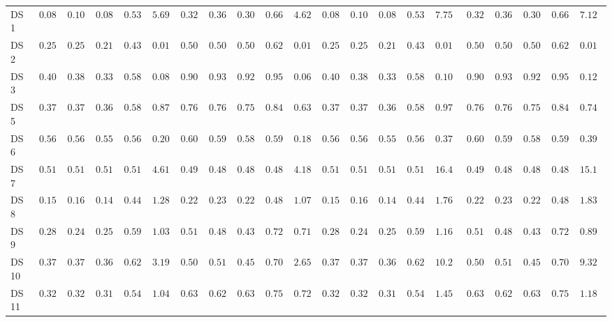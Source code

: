 {\begin{longtable}{|l|ccccc|ccccc|ccccc|ccccc|}
		DS 1 & $0.0833$ & $0.1024$ & $0.0858$ & $0.5325$ & $5.6923$ & $0.3264$ & $0.3657$ & $0.3035$ & $0.6697$ & $\boldsymbol{4.6228}$ & $0.0833$ & $0.1024$ & $0.0858$ & $0.5325$ & $7.7565$ & $0.3264$ & $0.3657$ & $0.3035$ & $0.6697$ & $7.1249$ \\
		DS 2 & $0.2500$ & $0.2500$ & $0.2167$ & $0.4375$ & $0.0159$ & $0.5000$ & $0.5000$ & $0.5000$ & $0.6250$ & $\boldsymbol{0.0113}$ & $0.2500$ & $0.2500$ & $0.2167$ & $0.4375$ & $0.0163$ & $0.5000$ & $0.5000$ & $0.5000$ & $0.6250$ & $0.0146$ \\
		DS 3 & $0.4000$ & $0.3812$ & $0.3333$ & $0.5875$ & $0.0849$ & $0.9000$ & $0.9375$ & $0.9226$ & $0.9583$ & $\boldsymbol{0.0665}$ & $0.4000$ & $0.3812$ & $0.3333$ & $0.5875$ & $0.1005$ & $0.9000$ & $0.9375$ & $0.9226$ & $0.9583$ & $0.1280$ \\
		DS 5 & $0.3768$ & $0.3772$ & $0.3614$ & $0.5848$ & $0.8787$ & $0.7681$ & $0.7657$ & $0.7571$ & $0.8438$ & $\boldsymbol{0.6383}$ & $0.3768$ & $0.3772$ & $0.3614$ & $0.5848$ & $0.9766$ & $0.7681$ & $0.7657$ & $0.7571$ & $0.8438$ & $0.7430$ \\
		DS 6 & $0.5600$ & $0.5641$ & $0.5572$ & $0.5641$ & $0.2068$ & $0.6000$ & $0.5929$ & $0.5833$ & $0.5929$ & $\boldsymbol{0.1801}$ & $0.5600$ & $0.5641$ & $0.5572$ & $0.5641$ & $0.3752$ & $\boldsymbol{0.6000}$ & $0.5929$ & $0.5833$ & $0.5929$ & $0.3972$ \\
		DS 7 & $0.5192$ & $0.5170$ & $0.5164$ & $0.5170$ & $4.6131$ & $0.4904$ & $0.4885$ & $0.4881$ & $0.4885$ & $\boldsymbol{4.1830}$ & $0.5192$ & $0.5170$ & $0.5164$ & $0.5170$ & $16.4149$ & $0.4904$ & $0.4885$ & $0.4881$ & $0.4885$ & $15.1621$ \\
		DS 8 & $0.1525$ & $0.1622$ & $0.1494$ & $0.4415$ & $1.2837$ & $0.2203$ & $0.2337$ & $0.2205$ & $0.4891$ & $\boldsymbol{1.0766}$ & $0.1525$ & $0.1622$ & $0.1494$ & $0.4415$ & $1.7665$ & $0.2203$ & $0.2337$ & $0.2205$ & $0.4891$ & $1.8381$ \\
		DS 9 & $0.2889$ & $0.2455$ & $0.2546$ & $0.5958$ & $1.0317$ & $0.5111$ & $0.4891$ & $0.4379$ & $0.7263$ & $\boldsymbol{0.7102}$ & $0.2889$ & $0.2455$ & $0.2546$ & $0.5958$ & $1.1654$ & $0.5111$ & $0.4891$ & $0.4379$ & $0.7263$ & $0.8985$ \\
		DS 10 & $0.3778$ & $0.3713$ & $0.3692$ & $0.6228$ & $3.1961$ & $0.5000$ & $0.5131$ & $0.4527$ & $0.7078$ & $\boldsymbol{2.6512}$ & $0.3778$ & $0.3713$ & $0.3692$ & $0.6228$ & $10.2753$ & $0.5000$ & $0.5131$ & $0.4527$ & $0.7078$ & $9.3209$ \\
		DS 11 & $0.3289$ & $0.3222$ & $0.3140$ & $0.5482$ & $1.0429$ & $0.6316$ & $0.6296$ & $0.6304$ & $0.7531$ & $\boldsymbol{0.7275}$ & $0.3289$ & $0.3222$ & $0.3140$ & $0.5482$ & $1.4510$ & $0.6316$ & $0.6296$ & $0.6304$ & $0.7531$ & $1.1850$ \\

\end{longtable}}
